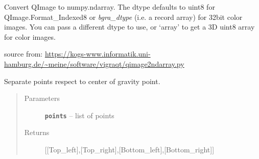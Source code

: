 \documentclass[letterpaper,10pt,english]{sphinxmanual}
\begin{document}

\begin{fulllineitems}
\label{RRtoolbox.lib:RRtoolbox.lib.image.plt2bgr}
\end{fulllineitems}


\begin{fulllineitems}
\label{RRtoolbox.lib:RRtoolbox.lib.image.plt2bgra}
\end{fulllineitems}


\begin{fulllineitems}
\label{RRtoolbox.lib:RRtoolbox.lib.image.qi2np}
Convert QImage to numpy.ndarray.  The dtype defaults to uint8
for QImage.Format\_Indexed8 or \emph{bgra\_dtype} (i.e. a record array)
for 32bit color images.  You can pass a different dtype to use, or
`array' to get a 3D uint8 array for color images.

source from: \href{https://kogs-www.informatik.uni-hamburg.de/~meine/software/vigraqt/qimage2ndarray.py}{https://kogs-www.informatik.uni-hamburg.de/\textasciitilde{}meine/software/vigraqt/qimage2ndarray.py}

\end{fulllineitems}


\begin{fulllineitems}
\label{RRtoolbox.lib:RRtoolbox.lib.image.quadrants}
Separate points respect to center of gravity point.
\begin{quote}\begin{description}
\item[{Parameters}] \leavevmode
\textbf{\texttt{points}} -- list of points

\item[{Returns}] \leavevmode
{[}{[}Top\_left{]},{[}Top\_right{]},{[}Bottom\_left{]},{[}Bottom\_right{]}{]}

\end{description}\end{quote}

\end{fulllineitems}
\end{document}
